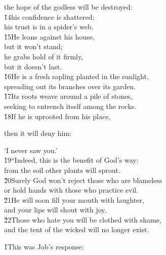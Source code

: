 \begin{poetry}
\poemll    the hope of the godless will be destroyed: \\
\poeml \v{14}his confidence is shattered; \\
\poemll    his trust is in a spider's web. \\
\poeml \v{15}He leans against his house, \\
\poemll    but it won't stand; \\
\poeml he grabs hold of it firmly, \\
\poemll    but it doesn't last. \\
\poeml \v{16}He is a fresh sapling planted in the sunlight, \\
\poemll    spreading out its branches over its garden. \\
\poeml \v{17}Its roots weave around a pile of stones, \\
\poemll    seeking to entrench itself among the rocks. \\
\poeml \v{18}If he is uprooted from his place,
\end{poetry}

then it will deny him:

\begin{poetry}
\poemlll       `I never saw you.' \\
\poeml \v{19}``Indeed, this is the benefit of God's way: \\
\poemll    from the soil other plants will sprout. \\
\poeml \v{20}Surely God won't reject those who are blameless \\
\poemll    or hold hands with those who practice evil. \\
\poeml \v{21}He will soon fill your mouth with laughter, \\
\poemll    and your lips will shout with joy. \\
\poeml \v{22}Those who hate you will be clothed with shame, \\
\poemll    and the tent of the wicked will no longer exist.
\end{poetry}

\v{1}This was Job's response:

